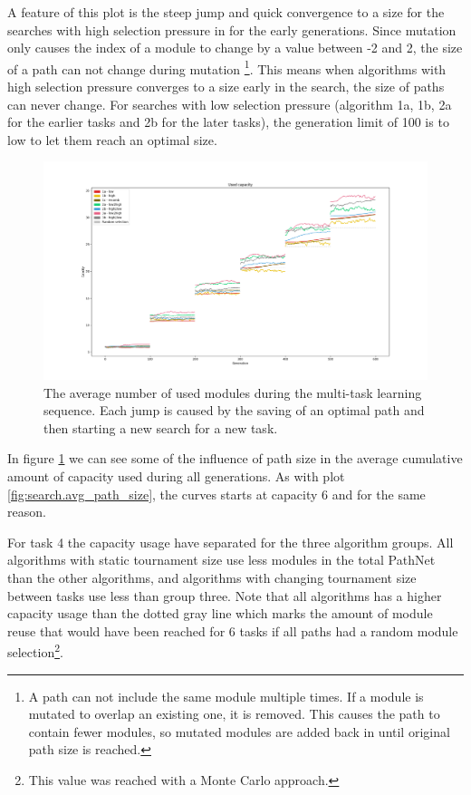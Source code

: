 A feature of this plot is the steep jump and quick convergence to a size for the searches with high selection pressure in for the early generations. Since mutation only causes the index of a module to change by a value between -2 and 2, the size of a path can not change during mutation \footnote{A path can not include the same module multiple times. If a module is mutated to overlap an existing one, it is removed. This causes the path to contain fewer modules, so mutated modules are added back in until original path size is reached.}. This means when algorithms with high selection pressure converges to a size early in the search, the size of paths can never change. For searches with low selection pressure (algorithm 1a, 1b, 2a for the earlier tasks and 2b for the later tasks), the generation limit of 100 is to low to let them reach an optimal size. 

\begin{figure}[h]
    \includegraphics[width=\textwidth]{Chapters/Experiments/search_algo/figures/Capacity_pr_generation.png}
    \caption{The average number of used modules during the multi-task learning sequence. Each jump is caused by the saving of an optimal path and then starting a new search for a new task. }
    \label{fig:search.capacity}
\end{figure}

In figure \ref{fig:search.capacity} we can see some of the influence of path size in the average cumulative amount of capacity used during all generations. As with plot \ref{fig:search.avg_path_size}, the curves starts at capacity 6 and for the same reason. 

For task 4 the capacity usage have separated for the three algorithm groups. All algorithms with static tournament size use less modules in the total PathNet than the other algorithms, and algorithms with changing tournament size between tasks use less than group three. Note that all algorithms has a higher capacity usage than the dotted gray line which marks the amount of module reuse that would have been reached for 6 tasks if all paths had a random module selection\footnote{This value was reached with a Monte Carlo approach.}.


